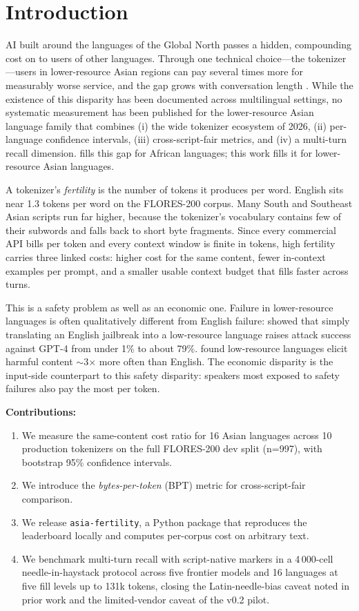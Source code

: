 \documentclass[11pt,a4paper]{article}
\begin{document}
\section{Introduction}
\label{sec:intro}

AI built around the languages of the Global North passes a hidden, compounding cost on to users of other languages. Through one technical choice---the tokenizer---users in lower-resource Asian regions can pay several times more for measurably worse service, and the gap grows with conversation length \citep{petrov2023language,ahia2023}. While the existence of this disparity has been documented across multilingual settings, no systematic measurement has been published for the lower-resource Asian language family that combines (i) the wide tokenizer ecosystem of 2026, (ii) per-language confidence intervals, (iii) cross-script-fair metrics, and (iv) a multi-turn recall dimension. \citet{somide2026african} fills this gap for African languages; this work fills it for lower-resource Asian languages.

A tokenizer's \emph{fertility} is the number of tokens it produces per word. English sits near 1.3 tokens per word on the FLORES-200 corpus. Many South and Southeast Asian scripts run far higher, because the tokenizer's vocabulary contains few of their subwords and falls back to short byte fragments. Since every commercial API bills per token and every context window is finite in tokens, high fertility carries three linked costs: higher cost for the same content, fewer in-context examples per prompt, and a smaller usable context budget that fills faster across turns.

This is a safety problem as well as an economic one. Failure in lower-resource languages is often qualitatively different from English failure: \citet{yong2023low} showed that simply translating an English jailbreak into a low-resource language raises attack success against GPT-4 from under 1\% to about 79\%. \citet{wang2023all} found low-resource languages elicit harmful content $\sim$3$\times$ more often than English. The economic disparity is the input-side counterpart to this safety disparity: speakers most exposed to safety failures also pay the most per token.

\textbf{Contributions:}
\begin{enumerate}
    \item We measure the same-content cost ratio for 16 Asian languages across 10 production tokenizers on the full FLORES-200 dev split (n=997), with bootstrap 95\% confidence intervals.
    \item We introduce the \emph{bytes-per-token} (BPT) metric for cross-script-fair comparison.
    \item We release \texttt{asia-fertility}, a Python package that reproduces the leaderboard locally and computes per-corpus cost on arbitrary text.
    \item We benchmark multi-turn recall with script-native markers in a 4\,000-cell needle-in-haystack protocol across five frontier models and 16 languages at five fill levels up to 131k tokens, closing the Latin-needle-bias caveat noted in prior work and the limited-vendor caveat of the v0.2 pilot.
\end{enumerate}
\end{document}
